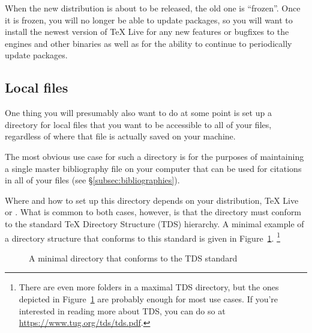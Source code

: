 When the new distribution is about to be released, the old one is ``frozen''.
Once it is frozen, you will no longer be able to update packages, so you will want to install the newest version of TeX Live for any new features or bugfixes to the engines and other binaries as well as for the ability to continue to periodically update packages.

\subsection{Local files}
\label{subsec:local-files}

One thing you will presumably also want to do at some point is set up a directory for local files that you want to be accessible to all of your  files, regardless of where that  file is actually saved on your machine.

The most obvious use case for such a directory is for the purposes of maintaining a single master bibliography file on your computer that can be used for citations in all of your  files (see \S\ref{subsec:bibliographies}).

Where and how to set up this directory depends on your distribution, TeX Live or .
What is common to both cases, however, is that the directory must conform to the standard \TeX{} Directory Structure (TDS) hierarchy.
A minimal example of a directory structure that conforms to this standard is given in Figure~\ref{fig:TDS}.%
\footnote{%
\label{fn:TDS}%
There are even more folders in a maximal TDS directory, but the ones depicted in Figure~\ref{fig:TDS} are probably enough for most use cases.
If you're interested in reading more about TDS, you can do so at \url{https://www.tug.org/tds/tds.pdf}.%
}

\begin{figure}[htbp]
	\centering
	\caption{A minimal directory that conforms to the TDS standard}
	\label{fig:TDS}
\end{figure}

